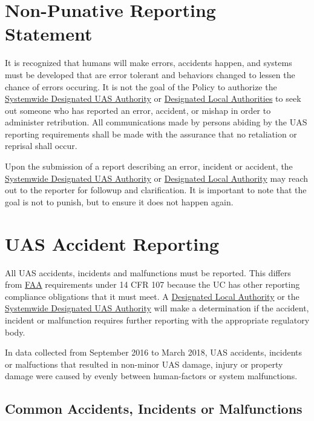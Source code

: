 \documentclass[
]{book}
\begin{document}
\hypertarget{ch-nonreprisal}{%
\chapter{Non-Punative Reporting Statement}\label{ch-nonreprisal}}

It is recognized that humans will make errors, accidents happen, and systems must be developed that are error tolerant and behaviors changed to lessen the chance of errors occuring. It is not the goal of the Policy to authorize the \protect\hyperlink{SDA}{Systemwide Designated UAS Authority} or \protect\hyperlink{DLA}{Designated Local Authorities} to seek out someone who has reported an error, accident, or mishap in order to administer retribution. All communications made by persons abiding by the UAS reporting requirements shall be made with the assurance that no retaliation or reprisal shall occur.

Upon the submission of a report describing an error, incident or accident, the \protect\hyperlink{SDA}{Systemwide Designated UAS Authority} or \protect\hyperlink{DLA}{Designated Local Authority} may reach out to the reporter for followup and clarification. It is important to note that the goal is not to punish, but to ensure it does not happen again.

\hypertarget{ch-accidents}{%
\chapter{UAS Accident Reporting}\label{ch-accidents}}

All UAS accidents, incidents and malfunctions must be reported. This differs from \protect\hyperlink{FAA}{FAA} requirements under 14 CFR 107 because the UC has other reporting compliance obligations that it must meet. A \protect\hyperlink{DLA}{Designated Local Authority} or the \protect\hyperlink{SDA}{Systemwide Designated UAS Authority} will make a determination if the accident, incident or malfunction requires further reporting with the appropriate regulatory body.

In data collected from September 2016 to March 2018, UAS accidents, incidents or malfuctions that resulted in non-minor UAS damage, injury or property damage were caused by evenly between human-factors or system malfunctions.

\hypertarget{s-common-accidents}{%
\section{Common Accidents, Incidents or Malfunctions}\label{s-common-accidents}}
\end{document}

